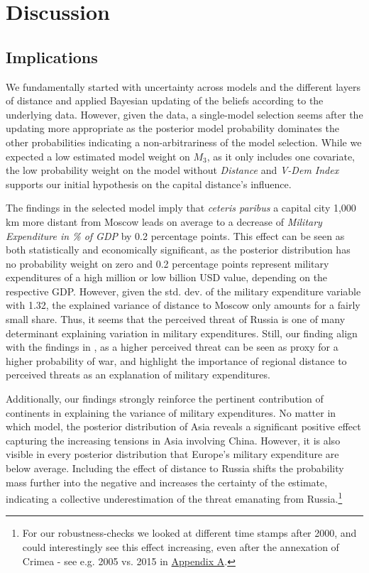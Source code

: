 \documentclass[12pt,a4paper]{article}
\begin{document}
\section{Discussion}
\subsection{Implications}
We fundamentally started with uncertainty across models and the different layers of distance and applied Bayesian updating of the beliefs according to the underlying data. However, given the data, a single-model selection seems after the updating more appropriate as the posterior model probability dominates the other probabilities indicating a non-arbitrariness of the model selection. While we expected a low estimated model weight on $M_3$, as it only includes one covariate, the low probability weight on the model without \textit{Distance} and \textit{V-Dem Index} supports our initial hypothesis on the capital distance's influence. \clearpage

The findings in the selected model imply that \textit{ceteris paribus} a capital city 1,000 km more distant from Moscow leads on average to a decrease of \textit{Military Expenditure in \% of GDP} by 0.2 percentage points. This effect can be seen as both statistically and economically significant, as the posterior distribution has no probability weight on zero and 0.2 percentage points represent military expenditures of a high million or low billion USD value, depending on the respective GDP. However, given the std. dev. of the military expenditure variable with 1.32, the explained variance of distance to Moscow only amounts for a fairly small share. Thus, it seems that the perceived threat of Russia is one of many determinant explaining variation in military expenditures. Still, our finding align with the findings in \citet{nordhaus2012}, as a higher perceived threat can be seen as proxy for a higher probability of war, and highlight the importance of regional distance to perceived threats as an explanation of military expenditures. 

Additionally, our findings strongly reinforce the pertinent contribution of continents in explaining the variance of military expenditures. No matter in which model, the posterior distribution of Asia reveals a significant positive effect capturing the increasing tensions in Asia involving China. However, it is also visible in every posterior distribution that Europe's military expenditure are below average. Including the effect of distance to Russia shifts the probability mass further into the negative and increases the certainty of the estimate, indicating a collective underestimation of the threat emanating from Russia.\footnote{For our robustness-checks we looked at different time stamps after 2000, and could interestingly see this effect increasing, even after the annexation of Crimea - see e.g. 2005 vs. 2015 in \hyperref[Appendix Tables]{\color{blue}Appendix A}.}
\end{document}
